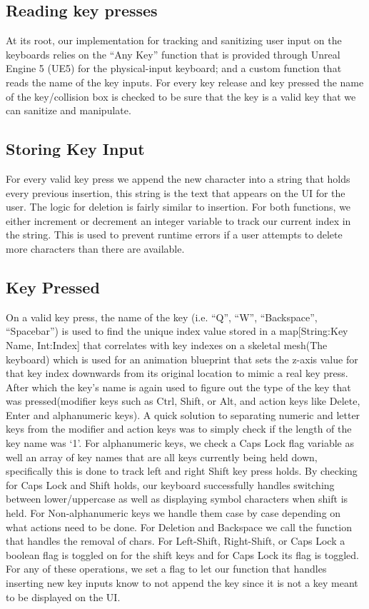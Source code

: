 \documentclass[acmlarge]{acmart}
\begin{document}
\subsection{Reading key presses}
At its root, our implementation for tracking and sanitizing user input on the keyboards relies on the “Any Key” function that is provided through Unreal Engine 5 (UE5) for the physical-input keyboard; and a custom function that reads the name of the key inputs. For every key release and key pressed the name of the key/collision box is checked to be sure that the key is a valid key that we can sanitize and manipulate. 
 
 
\subsection{Storing Key Input}
For every valid key press we append the new character into a string that holds every previous insertion, this string is the text that appears on the UI for the user. The logic for deletion is fairly similar to insertion. For both functions, we either increment or decrement an integer variable to track our current index in the string. This is used to prevent runtime errors if a user attempts to delete more characters than there are available.
 
 
\subsection{Key Pressed}
On a valid key press, the name of the key (i.e. “Q”, “W”, “Backspace”, “Spacebar”) is used to find the unique index value stored in a map[String:Key Name, Int:Index] that correlates with key indexes on a skeletal mesh(The keyboard) which is used for an animation blueprint that sets the z-axis value for that key index downwards from its original location to mimic a real key press. After which the key's name is again used to figure out the type of the key that was pressed(modifier keys such as Ctrl, Shift, or Alt, and action keys like Delete, Enter and alphanumeric keys). A quick solution to separating numeric and letter keys from the modifier and action keys was to simply check if the length of the key name was ‘1’. For alphanumeric keys, we check a Caps Lock flag variable as well an array of key names that are all keys currently being held down, specifically this is done to track left and right Shift key press holds. By checking for Caps Lock and Shift holds, our keyboard successfully handles switching between lower/uppercase as well as displaying symbol characters when shift is held. For Non-alphanumeric keys we handle them case by case depending on what actions need to be done. For Deletion and Backspace we call the function that handles the removal of chars. For Left-Shift, Right-Shift, or Caps Lock a boolean flag is toggled on for the shift keys and for Caps Lock its flag is toggled. For any of these operations, we set a flag to let our function that handles inserting new key inputs know to not append the key since it is not a key meant to be displayed on the UI. 
 
\end{document}
